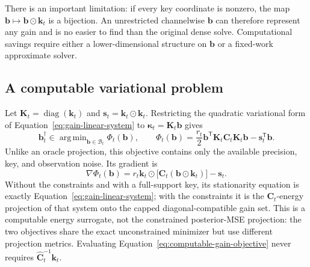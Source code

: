 \documentclass[11pt]{article}
\newcommand{\vct}[1]{\boldsymbol{#1}}
\newcommand{\tr}{\mathsf{T}}
\DeclareMathOperator{\diag}{diag}
\DeclareMathOperator*{\argmin}{arg\,min}
\begin{document}
There is an important limitation: if every key coordinate is nonzero, the map
$\vct{b}\mapsto\vct{b}\odot\vct{k}_t$ is a bijection.  An unrestricted
channelwise $\vct{b}$ can therefore represent any gain and is no easier to find
than the original dense solve.  Computational savings require either a
lower-dimensional structure on $\vct{b}$ or a fixed-work approximate solver.

\subsection{A computable variational problem}

Let $\vct{K}_t=\diag(\vct{k}_t)$ and
$\vct{s}_t=\vct{k}_t\odot\vct{k}_t$.  Restricting the quadratic variational
form of Equation~\eqref{eq:gain-linear-system} to
$\vct{\kappa}_t=\vct{K}_t\vct{b}$ gives
\begin{equation}
  \boxed{
  \vct{b}_t^\dagger
  \in\argmin_{\vct{b}\in\mathcal B_t}
  \Phi_t(\vct{b}),
  \qquad
  \Phi_t(\vct{b})
  =\frac{r_t}{2}\vct{b}^{\tr}\vct{K}_t\vct{C}_t\vct{K}_t\vct{b}
   -\vct{s}_t^{\tr}\vct{b}.}
  \label{eq:computable-gain-objective}
\end{equation}
Unlike an oracle projection, this objective contains only the available
precision, key, and observation noise.  Its gradient is
\begin{equation}
  \nabla\Phi_t(\vct{b})
  =r_t\vct{k}_t\odot
    \bigl[\vct{C}_t(\vct{b}\odot\vct{k}_t)\bigr]
   -\vct{s}_t.
  \label{eq:computable-gain-gradient}
\end{equation}
Without the constraints and with a full-support key, its stationarity equation
is exactly Equation~\eqref{eq:gain-linear-system}; with the constraints it is
the $\vct{C}_t$-energy projection of that system onto the capped
diagonal-compatible gain set.  This is a computable energy surrogate, not the
constrained posterior-MSE projection: the two objectives share the exact
unconstrained minimizer but use different projection metrics.  Evaluating
Equation~\eqref{eq:computable-gain-objective} never requires
$\widehat{\vct{C}}_t^{-1}\vct{k}_t$.
\end{document}
